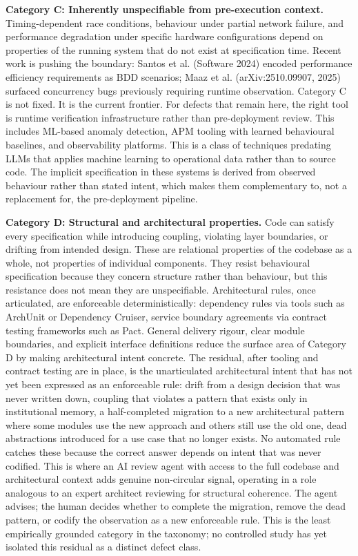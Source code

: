 \documentclass{article}
\begin{document}
\textbf{Category C: Inherently unspecifiable from pre-execution context.}
Timing-dependent race conditions, behaviour under partial network failure,
and performance degradation under specific hardware configurations depend
on properties of the running system that do not exist at specification
time. Recent work is pushing the boundary: Santos et al. (Software 2024)
encoded performance efficiency requirements as BDD scenarios; Maaz et al.
(arXiv:2510.09907, 2025) surfaced concurrency bugs previously requiring
runtime observation. Category C is not fixed. It is the current frontier.
For defects that remain here, the right tool is runtime verification
infrastructure rather than pre-deployment review. This includes
ML-based anomaly detection, APM tooling with learned behavioural
baselines, and observability platforms. This is a class of techniques predating
LLMs that applies machine learning to operational data rather than to
source code. The implicit specification in these systems is derived from
observed behaviour rather than stated intent, which makes them
complementary to, not a replacement for, the pre-deployment pipeline.

\textbf{Category D: Structural and architectural properties.} Code can satisfy
every specification while introducing coupling, violating layer boundaries,
or drifting from intended design. These are relational properties of the
codebase as a whole, not properties of individual components. They resist
behavioural specification because they concern structure rather than
behaviour, but this resistance does not mean they are unspecifiable. Architectural rules,
once articulated, are enforceable deterministically: dependency rules via
tools such as ArchUnit or Dependency Cruiser, service boundary agreements
via contract testing frameworks such as Pact. General delivery rigour,
clear module boundaries, and explicit interface definitions reduce the
surface area of Category D by making architectural intent concrete. The
residual, after tooling and contract testing are in place, is the
unarticulated architectural intent that has not yet been expressed as an
enforceable rule: drift from a design decision that was never written down,
coupling that violates a pattern that exists only in institutional memory,
a half-completed migration to a new architectural pattern where some
modules use the new approach and others still use the old one, dead
abstractions introduced for a use case that no longer exists. No automated
rule catches these because the correct answer depends on intent that was
never codified. This is where an AI review agent with access to the full
codebase and architectural context adds genuine non-circular signal,
operating in a role analogous to an expert architect reviewing for
structural coherence. The agent advises; the human decides whether to
complete the migration, remove the dead pattern, or codify the observation
as a new enforceable rule. This is the least empirically grounded category
in the taxonomy; no controlled study has yet isolated this residual as a
distinct defect class.
\end{document}
